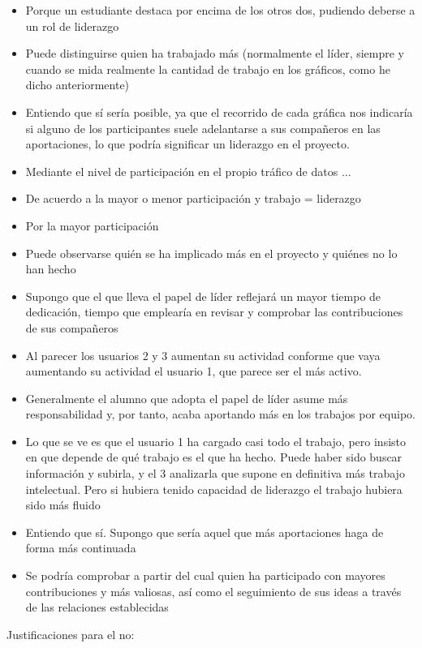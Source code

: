 \begin{itemize}
\item Porque un estudiante destaca por encima de los otros dos, pudiendo deberse a un rol de liderazgo
\item Puede distinguirse quien ha trabajado más (normalmente el líder, siempre y cuando se mida realmente la cantidad de trabajo en los gráficos, como he dicho anteriormente)
\item Entiendo que sí sería posible, ya que el recorrido de cada gráfica nos indicaría si alguno de los participantes suele adelantarse a sus compañeros en las aportaciones, lo que podría significar un liderazgo en el proyecto.
\item Mediante el nivel de participación en el propio tráfico de datos ...
\item De acuerdo a la mayor o menor participación y trabajo = liderazgo
\item Por la mayor participación 
\item Puede observarse quién se ha implicado más en el proyecto y quiénes no lo han hecho
\item Supongo que el que lleva el papel de líder reflejará un mayor tiempo de dedicación, tiempo que emplearía en revisar y comprobar las contribuciones de sus compañeros
\item Al parecer los usuarios 2 y 3 aumentan su actividad conforme que vaya aumentando su actividad el usuario 1, que parece ser el más activo.
\item Generalmente el alumno que adopta el papel de líder asume más responsabilidad y, por tanto, acaba aportando más en los trabajos por equipo.
\item Lo que se ve es que el usuario 1 ha cargado casi todo el trabajo, pero insisto en que depende de qué trabajo es el que ha hecho. Puede haber sido buscar información y subirla, y el 3 analizarla que supone en definitiva más trabajo intelectual. Pero si hubiera tenido capacidad de liderazgo el trabajo hubiera sido más fluido
\item Entiendo que sí. Supongo que sería aquel que más aportaciones haga de forma más continuada
\item Se podría comprobar a partir del cual  quien ha participado con mayores contribuciones y más valiosas, así como el seguimiento de sus ideas a través de las relaciones establecidas
\end{itemize}

Justificaciones para el no:

